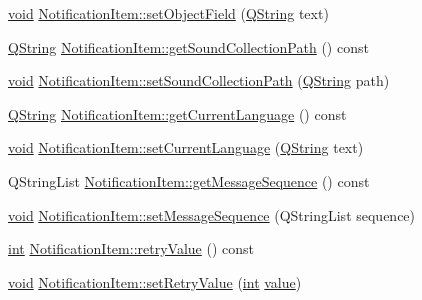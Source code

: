 \begin{DoxyCompactItemize}
\item 
\hyperlink{group___u_a_v_objects_plugin_ga444cf2ff3f0ecbe028adce838d373f5c}{void} \hyperlink{group__notifyplugin_ga54c72d7ede2e6cc94ba5121c04f379f9}{Notification\-Item\-::set\-Object\-Field} (\hyperlink{group___u_a_v_objects_plugin_gab9d252f49c333c94a72f97ce3105a32d}{Q\-String} text)
\item 
\hyperlink{group___u_a_v_objects_plugin_gab9d252f49c333c94a72f97ce3105a32d}{Q\-String} \hyperlink{group__notifyplugin_ga02d674a0d98fc50edb96e8e487e4f247}{Notification\-Item\-::get\-Sound\-Collection\-Path} () const 
\item 
\hyperlink{group___u_a_v_objects_plugin_ga444cf2ff3f0ecbe028adce838d373f5c}{void} \hyperlink{group__notifyplugin_ga51e72a159e74fc6c2f4575589caaf5b1}{Notification\-Item\-::set\-Sound\-Collection\-Path} (\hyperlink{group___u_a_v_objects_plugin_gab9d252f49c333c94a72f97ce3105a32d}{Q\-String} path)
\item 
\hyperlink{group___u_a_v_objects_plugin_gab9d252f49c333c94a72f97ce3105a32d}{Q\-String} \hyperlink{group__notifyplugin_ga90dda23b3c620a17440f8708a4e98241}{Notification\-Item\-::get\-Current\-Language} () const 
\item 
\hyperlink{group___u_a_v_objects_plugin_ga444cf2ff3f0ecbe028adce838d373f5c}{void} \hyperlink{group__notifyplugin_ga125828e3dae6986b12d315319b3ee24a}{Notification\-Item\-::set\-Current\-Language} (\hyperlink{group___u_a_v_objects_plugin_gab9d252f49c333c94a72f97ce3105a32d}{Q\-String} text)
\item 
Q\-String\-List \hyperlink{group__notifyplugin_gad9a4c112e8b27294870f09c7c3bf6bd8}{Notification\-Item\-::get\-Message\-Sequence} () const 
\item 
\hyperlink{group___u_a_v_objects_plugin_ga444cf2ff3f0ecbe028adce838d373f5c}{void} \hyperlink{group__notifyplugin_gad8bface53f8c0b678ba53efa7607c644}{Notification\-Item\-::set\-Message\-Sequence} (Q\-String\-List sequence)
\item 
\hyperlink{ioapi_8h_a787fa3cf048117ba7123753c1e74fcd6}{int} \hyperlink{group__notifyplugin_gad3ef16c40fa24c6362f0a5b8dcf7106a}{Notification\-Item\-::retry\-Value} () const 
\item 
\hyperlink{group___u_a_v_objects_plugin_ga444cf2ff3f0ecbe028adce838d373f5c}{void} \hyperlink{group__notifyplugin_gace1ba5eab850d1945aeede024e405463}{Notification\-Item\-::set\-Retry\-Value} (\hyperlink{ioapi_8h_a787fa3cf048117ba7123753c1e74fcd6}{int} \hyperlink{glext_8h_aa0e2e9cea7f208d28acda0480144beb0}{value})
\item 

\end{DoxyCompactItemize}
